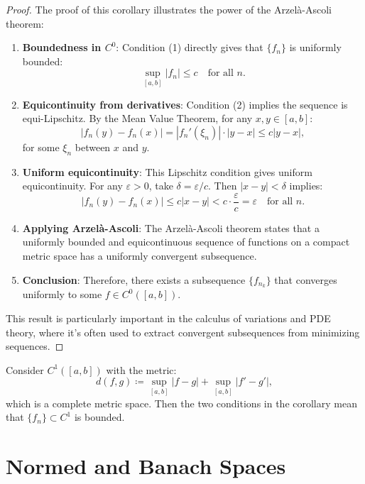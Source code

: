 \begin{proof}
The proof of this corollary illustrates the power of the Arzelà-Ascoli theorem:

\begin{enumerate}
\item \textbf{Boundedness in $C^0$}: Condition (1) directly gives that $\{f_n\}$ is uniformly bounded:
\[
\sup_{[a,b]} |f_n| \leq c \quad \text{for all } n.
\]

\item \textbf{Equicontinuity from derivatives}: Condition (2) implies the sequence is equi-Lipschitz. By the Mean Value Theorem, for any $x, y \in [a,b]$:
\[
|f_n(y) - f_n(x)| = |f_n'(\xi_n)| \cdot |y - x| \leq c|y - x|,
\]
for some $\xi_n$ between $x$ and $y$.

\item \textbf{Uniform equicontinuity}: This Lipschitz condition gives uniform equicontinuity. For any $\varepsilon > 0$, take $\delta = \varepsilon/c$. Then $|x - y| < \delta$ implies:
\[
|f_n(y) - f_n(x)| \leq c|x - y| < c \cdot \frac{\varepsilon}{c} = \varepsilon \quad \text{for all } n.
\]

\item \textbf{Applying Arzelà-Ascoli}: The Arzelà-Ascoli theorem states that a uniformly bounded and equicontinuous sequence of functions on a compact metric space has a uniformly convergent subsequence.

\item \textbf{Conclusion}: Therefore, there exists a subsequence $\{f_{n_k}\}$ that converges uniformly to some $f \in C^0([a,b])$.
\end{enumerate}

This result is particularly important in the calculus of variations and PDE theory, where it's often used to extract convergent subsequences from minimizing sequences.
\end{proof}

\begin{remark}
Consider $C^1([a,b])$ with the metric:
\[
d(f,g) \coloneqq \sup_{[a,b]} |f - g| + \sup_{[a,b]} |f' - g'|,
\]
which is a complete metric space. Then the two conditions in the corollary mean that $\{f_n\} \subset C^1$ is bounded.
\end{remark}

\clearpage
\section{Normed and Banach Spaces}

